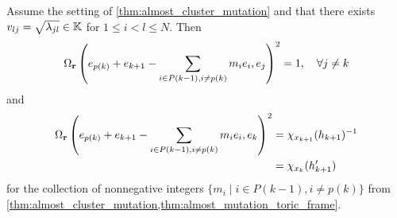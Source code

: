 \begin{theorem}

	Assume the setting of \cref{thm:almost_cluster_mutation} and that there exists $v_{lj}
		= \sqrt{\lambda_{jl}} \in \mathbb{K}$ for $1 \leq i < l \leq N$. Then
	\begin{equation}  \label{eq:Omega_r_squared_one}
		\Omega_{\mathbf{r}}\left(e_{p(k)} + e_{k+1} - \sum_{i \in P(k-1), i\neq p(k)} m_i e_i, e_j\right)^2  = 1, \quad \forall j \neq k
	\end{equation}
	and
	\begin{equation}\label{eq:Omega_r_squared_ek}
		\begin{aligned}
			\Omega_{\mathbf{r}}\left(e_{p(k)} + e_{k+1} - \sum_{i \in P(k-1), i\neq p(k)}m_i e_i, e_k\right)^2 & = \chi_{x_{k+1}}(h_{k+1})^{-1} \\
			                                                                                             & = \chi_{x_k}(h'_{k+1})
		\end{aligned}
	\end{equation}
	for the collection of nonnegative integers $\{m_i \mid i \in P(k-1), i\neq p(k)\}$ from
	\cref{thm:almost_cluster_mutation,thm:almost_mutation_toric_frame}.

\end{theorem}
